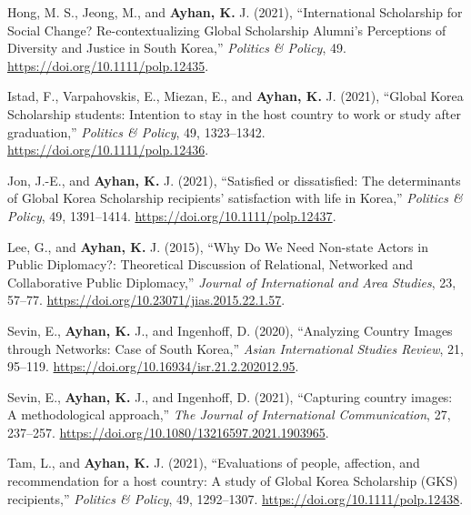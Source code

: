 \documentclass[11pt,a4paper,]{awesome-cv}
\begin{document}
\leavevmode{}%
Hong, M. S., Jeong, M., and \textbf{Ayhan, K.} J. (2021),
{``International {Scholarship} for {Social} {Change}?
{Re}-contextualizing {Global} {Scholarship} {Alumni}'s {Perceptions} of
{Diversity} and {Justice} in {South} {Korea},''} \emph{Politics \&
Policy}, 49. \url{https://doi.org/10.1111/polp.12435}.

\leavevmode{}%
Istad, F., Varpahovskis, E., Miezan, E., and \textbf{Ayhan, K.} J.
(2021), {``Global {Korea} {Scholarship} students: {Intention} to stay in
the host country to work or study after graduation,''} \emph{Politics \&
Policy}, 49, 1323--1342. \url{https://doi.org/10.1111/polp.12436}.

\leavevmode{}%
Jon, J.-E., and \textbf{Ayhan, K.} J. (2021), {``Satisfied or
dissatisfied: {The} determinants of {Global} {Korea} {Scholarship}
recipients' satisfaction with life in {Korea},''} \emph{Politics \&
Policy}, 49, 1391--1414. \url{https://doi.org/10.1111/polp.12437}.

\leavevmode{}%
Lee, G., and \textbf{Ayhan, K.} J. (2015), {``Why {Do} {We} {Need}
{Non}-state {Actors} in {Public} {Diplomacy}?: {Theoretical}
{Discussion} of {Relational}, {Networked} and {Collaborative} {Public}
{Diplomacy},''} \emph{Journal of International and Area Studies}, 23,
57--77. \url{https://doi.org/10.23071/jias.2015.22.1.57}.

\leavevmode{}%
Sevin, E., \textbf{Ayhan, K.} J., and Ingenhoff, D. (2020), {``Analyzing
{Country} {Images} through {Networks}: {Case} of {South} {Korea},''}
\emph{Asian International Studies Review}, 21, 95--119.
\url{https://doi.org/10.16934/isr.21.2.202012.95}.

\leavevmode{}%
Sevin, E., \textbf{Ayhan, K.} J., and Ingenhoff, D. (2021), {``Capturing
country images: A methodological approach,''} \emph{The Journal of
International Communication}, 27, 237--257.
\url{https://doi.org/10.1080/13216597.2021.1903965}.

\leavevmode{}%
Tam, L., and \textbf{Ayhan, K.} J. (2021), {``Evaluations of people,
affection, and recommendation for a host country: {A} study of {Global}
{Korea} {Scholarship} ({GKS}) recipients,''} \emph{Politics \& Policy},
49, 1292--1307. \url{https://doi.org/10.1111/polp.12438}.
\end{document}
